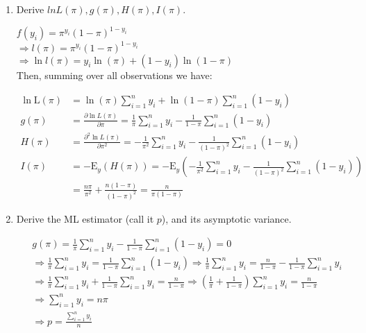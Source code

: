 \documentclass[11pt,reqno]{amsart}\usepackage[]{graphicx}\usepackage[]{color}
\newcommand{\ksp}{\vspace{0.1in}}   %
\newcommand{\kl}{\left(}
\newcommand{\kr}{\right)}
\begin{document}
\begin{enumerate}
\item  Derive $lnL\kl \pi \kr, g\kl \pi \kr, H\kl \pi \kr, I\kl \pi \kr$.

$f\kl y_i \kr =\pi^{y_i}\kl 1-\pi \kr^{1-y_i}$\\
$\Rightarrow l\kl \pi \kr =\pi^{y_i}\kl 1-\pi \kr^{1-y_i}$\\
$\Rightarrow \ln l\kl \pi \kr = y_i \ln \kl \pi \kr + \kl 1-y_i\kr \ln\kl 1-\pi \kr$\\

Then, summing over all observations we have:
\ksp

\begin{equation*}
\begin{split}
\ln \mathrm{L}(\pi)&=\ln (\pi) \sum_{i=1}^{n} y_{i}+\ln (1-\pi) \sum_{i=1}^{n}\left(1-y_{i}\right)\\
g(\pi)&=\frac{\partial \ln L(\pi)}{\partial \pi}=\frac{1}{\pi} \sum_{i=1}^{n} y_{i}-\frac{1}{1-\pi} \sum_{i=1}^{n}\left(1-y_{i}\right)\\
H(\pi)&=\frac{\partial^{2} \ln L(\pi)}{\partial \pi^{2}}=-\frac{1}{\pi^{2}} \sum_{i=1}^{n} y_{i}-\frac{1}{(1-\pi)^{2}} \sum_{i=1}^{n}\left(1-y_{i}\right)\\
I(\pi)&=-\mathrm{E}_{y}(H(\pi))=-\mathrm{E}_{y}\left(-\frac{1}{\pi^{2}} \sum_{i=1}^{n} y_{i}-\frac{1}{(1-\pi)^{2}} \sum_{i=1}^{n}\left(1-y_{i}\right)\right)\\&=\frac{n \pi}{\pi^{2}}+\frac{n(1-\pi)}{(1-\pi)^{2}}=\frac{n}{\pi(1-\pi)}
\end{split}
\end{equation*}



\item	Derive the ML estimator (call it $p$), and its asymptotic variance.

\begin{equation*}
\begin{split}
& g(\pi)=\frac{1}{\pi} \sum_{i=1}^{n} y_{i}-\frac{1}{1-\pi} \sum_{i=1}^{n}\left(1-y_{i}\right)=0\\
& \Rightarrow \frac{1}{\pi} \sum_{i=1}^{n} y_{i}=\frac{1}{1-\pi} \sum_{i=1}^{n}\left(1-y_{i}\right) \Rightarrow \frac{1}{\pi} \sum_{i=1}^{n} y_{i}=\frac{n}{1-\pi}-\frac{1}{1-\pi} \sum_{i=1}^{n} y_{i} \\
& \Rightarrow \frac{1}{\pi} \sum_{i=1}^{n} y_{i}+\frac{1}{1-\pi} \sum_{i=1}^{n} y_{i}=\frac{n}{1-\pi} \Rightarrow \left(\frac{1}{\pi}+\frac{1}{1-\pi}\right) \sum_{i=1}^{n} y_{i}=\frac{n}{1-\pi}\\
&\Rightarrow \sum_{i=1}^{n} y_{i} = n\pi\\
&\Rightarrow p=\frac{\sum_{i=1}^{n} y_{i}}{n}
\end{split}
\end{equation*}


\end{enumerate}
\end{document}
